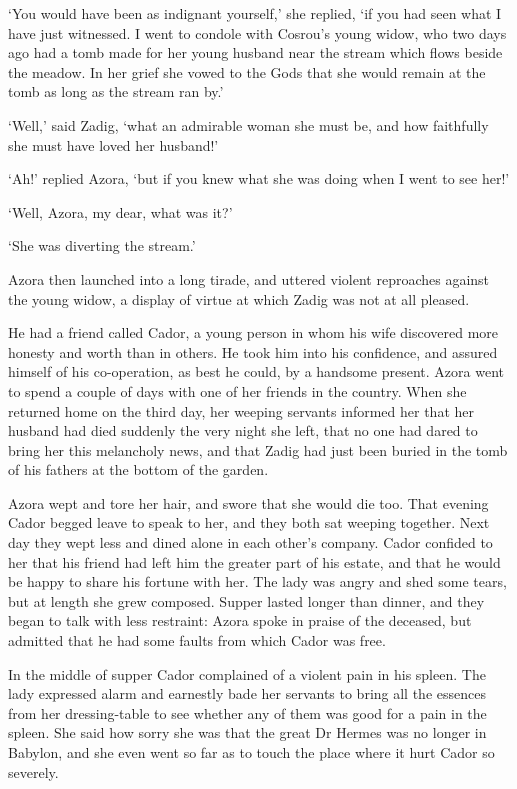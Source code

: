 \documentclass{article}
\begin{document}
\begin{center}
`You would have been as indignant yourself,' she replied, `if you had seen what 
I have just witnessed. I went to condole with Cosrou's young widow, who two days 
ago had a tomb made for her young husband near the stream which flows beside the 
meadow. In her grief she vowed to the Gods that she would remain at the tomb as 
long as the stream ran by.' 

`Well,' said Zadig, `what an admirable woman she must be, and how faithfully she 
must have loved her husband!' 

`Ah!' replied Azora, `but if you knew what she was doing when I went to see her!' 

`Well, Azora, my dear, what was it?' 

`She was diverting the stream.' 

Azora then launched into a long tirade, and uttered violent reproaches against 
the young widow, a display of virtue at which Zadig was not at all pleased. 

He had a friend called Cador, a young person in whom his wife discovered more honesty 
and worth than in others. He took him into his confidence, and assured himself 
of his co-operation, as best he could, by a handsome present. Azora went to spend 
a couple of days with one of her friends in the country. When she returned home 
on the third day, her weeping servants informed her that her husband had died suddenly 
the very night she left, that no one had dared to bring her this melancholy news, 
and that Zadig had just been buried in the tomb of his fathers at the bottom of 
the garden. 

Azora wept and tore her hair, and swore that she would die too. That evening Cador 
begged leave to speak to her, and they both sat weeping together. Next day they 
wept less and dined alone in each other's company. Cador confided to her that his 
friend had left him the greater part of his estate, and that he would be happy 
to share his fortune with her. The lady was angry and shed some tears, but at length 
she grew composed. Supper lasted longer than dinner, and they began to talk with 
less restraint: Azora spoke in praise of the deceased, but admitted that he had 
some faults from which Cador was free. 

In the middle of supper Cador complained of a violent pain in his spleen. The lady 
expressed alarm and earnestly bade her servants to bring all the essences from 
her dressing-table to see whether any of them was good for a pain in the spleen. 
She said how sorry she was that the great Dr Hermes was no longer in Babylon, and 
she even went so far as to touch the place where it hurt Cador so severely. 


\end{center}
\end{document}
